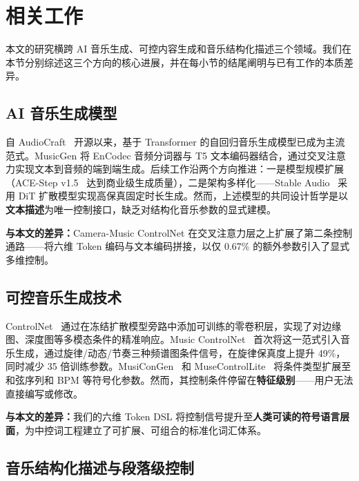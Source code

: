 \documentclass[UTF8,12pt,a4paper]{ctexart}
\begin{document}
\section{相关工作}

本文的研究横跨 AI 音乐生成、可控内容生成和音乐结构化描述三个领域。我们在本节分别综述这三个方向的核心进展，并在每小节的结尾阐明与已有工作的本质差异。

\subsection{AI 音乐生成模型}

自 AudioCraft~\cite{musicgen} 开源以来，基于 Transformer 的自回归音乐生成模型已成为主流范式。MusicGen 将 EnCodec 音频分词器与 T5 文本编码器结合，通过交叉注意力实现文本到音频的端到端生成。后续工作沿两个方向推进：一是模型规模扩展（ACE-Step v1.5~\cite{acestep} 达到商业级生成质量），二是架构多样化——Stable Audio~\cite{stableaudio} 采用 DiT 扩散模型实现高保真固定时长生成。然而，上述模型的共同设计哲学是以\textbf{文本描述}为唯一控制接口，缺乏对结构化音乐参数的显式建模。

\textbf{与本文的差异：}Camera-Music ControlNet 在交叉注意力层之上扩展了第二条控制通路——将六维 Token 编码与文本编码拼接，以仅 0.67\% 的额外参数引入了显式多维控制。

\subsection{可控音乐生成技术}

ControlNet~\cite{controlnet} 通过在冻结扩散模型旁路中添加可训练的零卷积层，实现了对边缘图、深度图等多模态条件的精准响应。Music ControlNet~\cite{musiccontrolnet} 首次将这一范式引入音乐生成，通过旋律/动态/节奏三种频谱图条件信号，在旋律保真度上提升 49\%，同时减少 35 倍训练参数。MusiConGen~\cite{musecong} 和 MuseControlLite~\cite{muselite} 将条件类型扩展至和弦序列和 BPM 等符号化参数。然而，其控制条件停留在\textbf{特征级别}——用户无法直接编写或修改。

\textbf{与本文的差异：}我们的六维 Token DSL 将控制信号提升至\textbf{人类可读的符号语言层面}，为中控词工程建立了可扩展、可组合的标准化词汇体系。

\subsection{音乐结构化描述与段落级控制}
\end{document}
